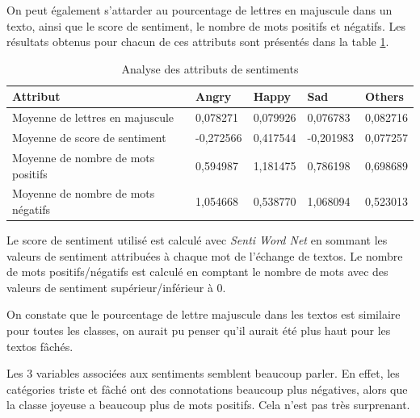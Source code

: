 On peut également s'attarder au pourcentage de lettres en majuscule dans un texto, ainsi que le score de sentiment, le nombre de mots positifs et négatifs. Les résultats obtenus pour chacun de ces attributs sont présentés dans la table \ref{table:pourcentages}.

\begin{longtable}[c]{@{}lllll@{}}
	\caption{Analyse des attributs de sentiments}
	\label{table:pourcentages}\\
	\toprule
	Attribut                           & Angry     & Happy    & Sad       & Others   \\* \midrule
	\endhead
	\bottomrule
	\endfoot
	\endlastfoot
	Moyenne de lettres en majuscule    & 0,078271  & 0,079926 & 0,076783  & 0,082716 \\
	Moyenne de score de sentiment      & -0,272566 & 0,417544 & -0,201983 & 0,077257 \\
	Moyenne de nombre de mots positifs & 0,594987  & 1,181475 & 0,786198  & 0,698689 \\
	Moyenne de nombre de mots négatifs & 1,054668  & 0,538770 & 1,068094  & 0,523013 \\* \bottomrule
\end{longtable}



Le score de sentiment utilisé est calculé avec \emph{Senti Word Net} en sommant les valeurs de sentiment attribuées à chaque mot de l'échange de textos. Le nombre de mots positifs/négatifs est calculé en comptant le nombre de mots avec des valeurs de sentiment supérieur/inférieur à 0.

On constate que le pourcentage de lettre majuscule dans les textos est similaire pour toutes les classes, on aurait pu penser qu'il aurait été plus haut pour les textos fâchés. 

Les 3 variables associées aux sentiments semblent beaucoup parler. En effet, les catégories triste et fâché ont des connotations beaucoup plus négatives, alors que la classe joyeuse a beaucoup plus de mots positifs. Cela n'est pas très surprenant.